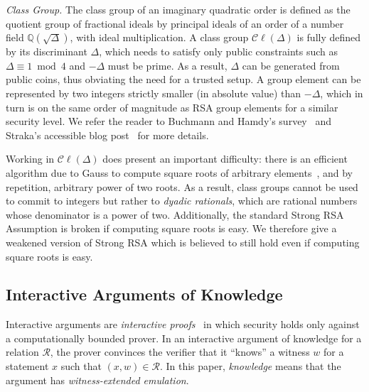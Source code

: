 \textit{Class Group.} The class group of an imaginary quadratic order is defined as the quotient group of fractional ideals by principal ideals of an order of a number field $\mathbb{Q}(\sqrt{\Delta})$, with ideal multiplication. A class group $\mathcal{C}\ell(\Delta)$ is fully defined by its discriminant $\Delta$, which needs to satisfy only public constraints such as $\Delta \equiv 1 \bmod 4$ and $-\Delta$ must be prime. As a result, $\Delta$ can be generated from public coins, thus obviating the need for a trusted setup. A group element can be represented by two integers strictly smaller (in absolute value) than $-\Delta$, which in turn is on the same order of magnitude as RSA group elements for a similar security level.  We refer the reader to Buchmann and Hamdy's survey~\cite{PKC/BucHam01} and Straka's accessible blog post~\cite{web/Stra19} for more details.

Working in $\mathcal{C}\ell(\Delta)$ does present an important difficulty: there is an efficient algorithm due to Gauss to compute square roots of arbitrary elements~\cite{jtn/BosSte96}, and by repetition, arbitrary power of two roots. As a result, class groups cannot be used to commit to integers but rather to \emph{dyadic rationals}, which are rational numbers whose denominator is a power of two.
Additionally, the standard Strong RSA Assumption is broken if computing square roots is easy. We therefore give a weakened version of Strong RSA which is believed to still hold even if computing square roots is easy.

\subsection{Interactive Arguments of Knowledge}
Interactive arguments are \emph{interactive proofs}~\cite{STOC:GolMicRac85} in which security holds only against a computationally bounded prover. In an interactive argument of knowledge for a relation $\mathcal{R}$, the prover convinces the verifier that it ``knows'' a witness $w$ for a statement $x$ such that $(x, w) \in \mathcal{R}$. In this paper, \emph{knowledge} means that the argument has \emph{witness-extended emulation}. %

